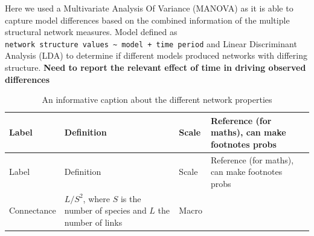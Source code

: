 \documentclass[
]{article}
\begin{document}
Here we used a Multivariate Analysis Of Variance (MANOVA) as it is able
to capture model differences based on the combined information of the
multiple structural network measures. Model defined as
\texttt{network\ structure\ values\ \textasciitilde{}\ model\ +\ time\ period}
and Linear Discriminant Analysis (LDA) to determine if different models
produced networks with differing structure. \textbf{Need to report the
relevant effect of time in driving observed differences}

\begin{longtable}[]{@{}
  >{\raggedright\arraybackslash}p{}
  >{\raggedright\arraybackslash}p{}
  >{\raggedright\arraybackslash}p{}
  >{\raggedright\arraybackslash}p{}@{}}
\caption{An informative caption about the different network
properties}\label{tbl-properties}\tabularnewline
\toprule\noalign{}
\begin{minipage}[b]{\linewidth}\raggedright
Label
\end{minipage} & \begin{minipage}[b]{\linewidth}\raggedright
Definition
\end{minipage} & \begin{minipage}[b]{\linewidth}\raggedright
Scale
\end{minipage} & \begin{minipage}[b]{\linewidth}\raggedright
Reference (for maths), can make footnotes probs
\end{minipage} \\
\midrule\noalign{}
\endfirsthead
\toprule\noalign{}
\begin{minipage}[b]{\linewidth}\raggedright
Label
\end{minipage} & \begin{minipage}[b]{\linewidth}\raggedright
Definition
\end{minipage} & \begin{minipage}[b]{\linewidth}\raggedright
Scale
\end{minipage} & \begin{minipage}[b]{\linewidth}\raggedright
Reference (for maths), can make footnotes probs
\end{minipage} \\
\midrule\noalign{}
\endhead
\bottomrule\noalign{}
\endlastfoot
Connectance & \(L/S^2\), where \(S\) is the number of species and \(L\)
the number of links & Macro & \\

\end{longtable}
\end{document}
